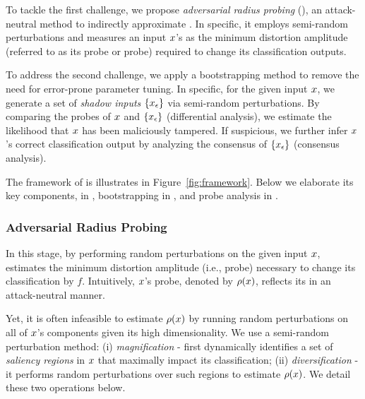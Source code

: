 To tackle the first challenge, we propose {\em adversarial radius probing} (\arp), an attack-neutral method to indirectly approximate \ar. In specific,
it employs semi-random perturbations and measures an input $x$'s \ar as the minimum distortion amplitude (referred to as its \ar probe or probe) required to change its classification outputs.

To address the second challenge, we apply a bootstrapping method to remove the need for error-prone parameter tuning. In specific, for the given input $x$, we generate a set of {\em shadow inputs} $\{x_{\epsilon}\}$ via semi-random perturbations. By comparing the probes of $x$ and $\{x_{\epsilon}\}$ (differential analysis), we estimate the likelihood that $x$ has been maliciously tampered. If suspicious, we further infer $x$'s correct classification output by analyzing the consensus of $\{x_{\epsilon}\}$ (consensus analysis).

The framework of \system is illustrates in Figure~\ref{fig:framework}. Below we elaborate its key components,
\arp in , bootstrapping in , and probe analysis in .


\subsubsection{Adversarial Radius Probing}
\label{sec:arp}

In this stage, by performing random perturbations on the given input $x$, \system estimates the minimum distortion amplitude (i.e., probe) necessary to change its classification by $f$. Intuitively, $x$'s probe, denoted by $\rho(x)$, reflects its \ar in an attack-neutral manner.

Yet, it is often infeasible to estimate $\rho(x)$ by running random perturbations on all of $x$'s components given its high dimensionality. We use a semi-random perturbation method: (i) {\em magnification} - \system first dynamically identifies a set of {\em saliency regions} in $x$ that maximally impact its classification; (ii) {\em diversification} - it performs random perturbations over such regions to estimate
$\rho(x)$. We detail these two operations below.





